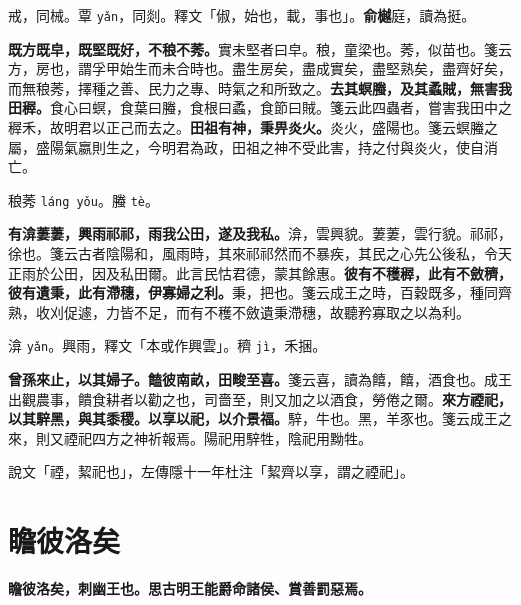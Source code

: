 \begin{quoting}戒，同械。覃 \texttt{yǎn}，同剡。釋文「俶，始也，載，事也」。\textbf{俞樾}庭，讀為挺。\end{quoting}

\textbf{既方既皁，既堅既好，不稂不莠。}{\footnotesize 實未堅者曰皁。稂，童梁也。莠，似苗也。箋云方，房也，謂孚甲始生而未合時也。盡生房矣，盡成實矣，盡堅熟矣，盡齊好矣，而無稂莠，擇種之善、民力之專、時氣之和所致之。}\textbf{去其螟螣，及其蟊賊，無害我田稺。}{\footnotesize 食心曰螟，食葉曰螣，食根曰蟊，食節曰賊。箋云此四蟲者，嘗害我田中之稺禾，故明君以正己而去之。}\textbf{田祖有神，秉畀炎火。}{\footnotesize 炎火，盛陽也。箋云螟螣之屬，盛陽氣嬴則生之，今明君為政，田祖之神不受此害，持之付與炎火，使自消亡。}

\begin{quoting}稂莠 \texttt{láng yǒu}。螣 \texttt{tè}。\end{quoting}

\textbf{有渰萋萋，興雨祁祁，雨我公田，遂及我私。}{\footnotesize 渰，雲興貌。萋萋，雲行貌。祁祁，徐也。箋云古者陰陽和，風雨時，其來祁祁然而不暴疾，其民之心先公後私，令天正雨於公田，因及私田爾。此言民怙君德，蒙其餘惠。}\textbf{彼有不穫稺，此有不斂穧，彼有遺秉，此有滯穗，伊寡婦之利。}{\footnotesize 秉，把也。箋云成王之時，百穀既多，種同齊熟，收刈促遽，力皆不足，而有不穫不斂遺秉滯穗，故聽矜寡取之以為利。}

\begin{quoting}渰 \texttt{yǎn}。興雨，釋文「本或作興雲」。穧 \texttt{jì}，禾捆。\end{quoting}

\textbf{曾孫來止，以其婦子。饁彼南畝，田畯至喜。}{\footnotesize 箋云喜，讀為饎，饎，酒食也。成王出觀農事，饋食耕者以勸之也，司嗇至，則又加之以酒食，勞倦之爾。}\textbf{來方禋祀，以其騂黑，與其黍稷。以享以祀，以介景福。}{\footnotesize 騂，牛也。黑，羊豕也。箋云成王之來，則又禋祀四方之神祈報焉。陽祀用騂牲，陰祀用黝牲。}

\begin{quoting}說文「禋，絜祀也」，左傳隱十一年杜注「絜齊以享，謂之禋祀」。\end{quoting}

\section{瞻彼洛矣}


\textbf{瞻彼洛矣，刺幽王也。思古明王能爵命諸侯、賞善罰惡焉。}

